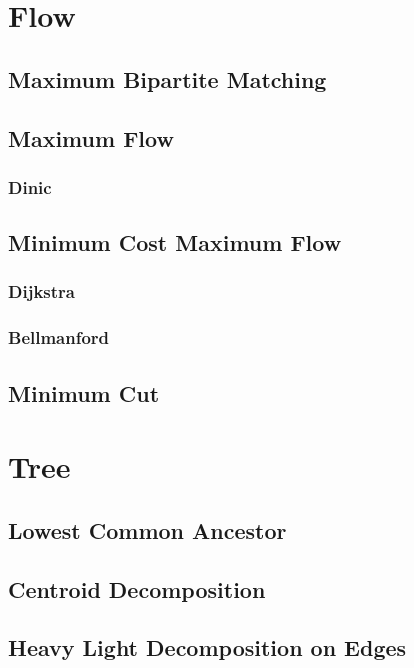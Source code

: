 \documentclass[10pt,a4paper]{report}
\begin{document}
	\section{Flow}
		\subsection{Maximum Bipartite Matching}
		\subsection{Maximum Flow}
			\subsubsection{Dinic}
				
		\subsection{Minimum Cost Maximum Flow}
			\subsubsection{Dijkstra}
				
			\subsubsection{Bellmanford}
		\subsection{Minimum Cut}
		
	\section{Tree}
		\subsection{Lowest Common Ancestor}
		\subsection{Centroid Decomposition}
			
		\subsection{Heavy Light Decomposition on Edges}
			
\end{document}
